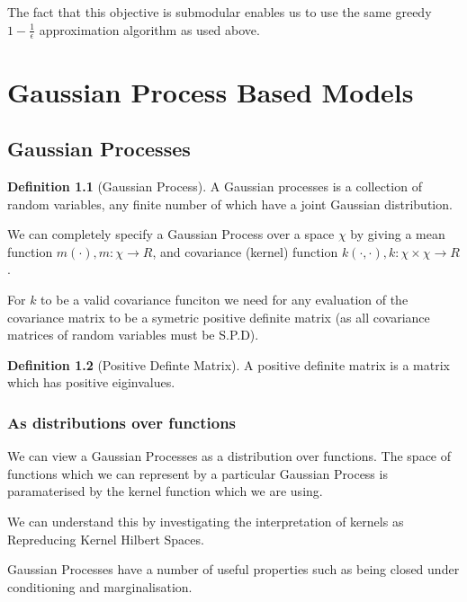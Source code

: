 \documentclass[12pt, a4paper]{report}
\theoremstyle{definition}
\newtheorem{definition}{Definition}[section]
\begin{document}
The fact that this objective is submodular enables us to use the same greedy $1 - \frac{1}{\epsilon}$ approximation algorithm as used above.

\chapter{Gaussian Process Based Models}
\label{Chap4}


\section{Gaussian Processes}


\begin{definition}[Gaussian Process]
    A Gaussian processes is a collection of random variables, any finite number of which have a joint Gaussian distribution. \cite[]{rasmussen2003gaussian}
\end{definition}


We can completely specify a Gaussian Process over a space $\chi$ by giving a mean function $m(\cdot), m : \chi \rightarrow R$, and covariance (kernel) function $k(\cdot, \cdot), k: \chi \times \chi \rightarrow R$.


For $k$ to be a valid covariance funciton we need for any evaluation of the covariance matrix to be a symetric positive definite matrix (as all covariance matrices of random variables must be S.P.D).

\begin{definition}[Positive Definte Matrix]
    A positive definite matrix is a matrix which has positive eiginvalues.
\end{definition}

\subsection{As distributions over functions}

We can view a Gaussian Processes as a distribution over functions. The space of functions which we can represent by a particular Gaussian Process is paramaterised by the kernel function which we are using.

We can understand this by investigating the interpretation of kernels as Repreducing Kernel Hilbert Spaces.





Gaussian Processes have a number of useful properties such as being closed under conditioning and marginalisation.
\end{document}
